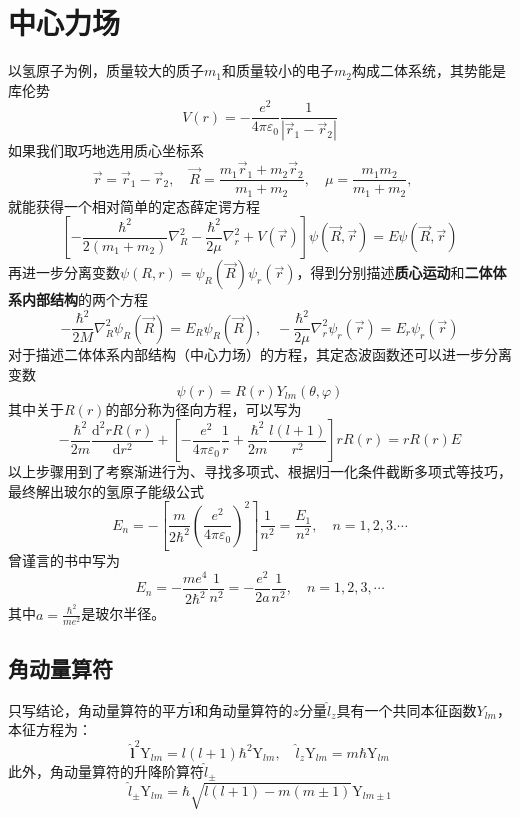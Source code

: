 \section{中心力场}
以氢原子为例，质量较大的质子$m_1$和质量较小的电子$m_2$构成二体系统，其势能是库伦势
$$
    V(r)=-\frac{e^2}{4\pi\varepsilon_0}\frac{1}{|\vec{r}_1-\vec{r}_2|}
$$
如果我们取巧地选用质心坐标系
$$
    \vec{r}=\vec{r}_1-\vec{r}_2, \quad
    \vec{R}=\frac{m_1\vec{r}_1+m_2\vec{r}_2}{m_1+m_2}, \quad
    \mu=\frac{m_1m_2}{m_1+m_2}, \quad
$$
就能获得一个相对简单的定态薛定谔方程
$$
    \left[-\frac{\hbar^2}{2(m_1+m_2)}\nabla_R^2-\frac{\hbar^2}{2\mu}\nabla_r^2+V(\vec{r})\right]\psi(\vec{R}, \vec{r})=E\psi(\vec{R}, \vec{r})
$$
再进一步分离变数$\psi(R, r)=\psi_R(\vec{R})\psi_r(\vec{r})$，得到分别描述\textbf{质心运动}和\textbf{二体体系内部结构}的两个方程
$$
    -\frac{\hbar^2}{2M}\nabla_R^2\psi_R(\vec{R})=E_R\psi_R(\vec{R}), \quad
    -\frac{\hbar^2}{2\mu}\nabla_r^2\psi_r(\vec{r})=E_r\psi_r(\vec{r})
$$
对于描述二体体系内部结构（中心力场）的方程，其定态波函数还可以进一步分离变数
$$
    \psi(r)=R(r)Y_{lm}(\theta, \varphi)
$$
其中关于$R(r)$的部分称为径向方程，可以写为
$$
    -\frac{\hbar^2}{2m}\frac{\mathrm{d}^2rR(r)}{\mathrm{d}r^2}+\left[-\frac{e^2}{4\pi\varepsilon_0}\frac{1}{r}+\frac{\hbar^2}{2m}\frac{l(l+1)}{r^2}\right]rR(r)=rR(r)E
$$
以上步骤用到了考察渐进行为、寻找多项式、根据归一化条件截断多项式等技巧，最终解出玻尔的氢原子能级公式
$$
    E_n=-\left[\frac{m}{2\hbar^2}\left(\frac{e^2}{4\pi\varepsilon_0}\right)^2 \right]\frac{1}{n^2}=\frac{E_1}{n^2}, \quad n=1,2,3.\cdots
$$
曾谨言的书中写为
$$
    \boxed{
        E_n=-\frac{me^4}{2\hbar^2}\frac{1}{n^2}=-\frac{e^2}{2a}\frac{1}{n^2},\quad n=1,2,3,\cdots
    }
$$
其中$a=\frac{\hbar^2}{me^2}$是玻尔半径。
\subsection{角动量算符}
只写结论，角动量算符的平方$\hat{\boldsymbol{l}}$和角动量算符的$z$分量$\hat{l}_z$具有一个共同本征函数$Y_{lm}$，本征方程为：
$$
    \hat{\boldsymbol{l}}^2\mathrm{Y}_{lm}=l(l+1)\hbar^2\mathrm{Y}_{lm}, \quad
    \hat{l}_z\mathrm{Y}_{lm}=m\hbar\mathrm{Y}_{lm}
$$
此外，角动量算符的升降阶算符$\hat{l}_{\pm}$
$$
    \hat{l}_{\pm}\mathrm{Y}_{lm}=\hbar\sqrt{l(l+1)-m(m \pm 1)}\mathrm{Y}_{lm \pm 1}
$$



